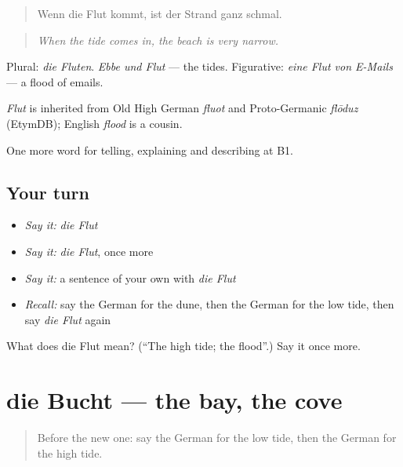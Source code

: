 \begin{quote}
Wenn die Flut kommt, ist der Strand ganz schmal.
\end{quote}

\begin{quote}
\emph{When the tide comes in, the beach is very narrow.}
\end{quote}

Plural: \emph{die Fluten}. \emph{Ebbe und Flut} — the tides. Figurative: \emph{eine Flut von E-Mails} — a flood of emails.

\begin{cousinweb}
\emph{Flut} is inherited from Old High German \emph{fluot} and Proto-Germanic \emph{flōduz} (EtymDB); English \emph{flood} is a cousin.
\end{cousinweb}

\begin{grammarlens}[title={What you've built}]
One more word for telling, explaining and describing at B1.
\end{grammarlens}

\subsection*{Your turn}
\begin{itemize}
\raggedright
  \item \emph{Say it:} \emph{die Flut}
  \item \emph{Say it:} \emph{die Flut}, once more
  \item \emph{Say it:} a sentence of your own with \emph{die Flut}
  \item \emph{Recall:} say the German for the dune, then the German for the low tide, then say \emph{die Flut} again
\end{itemize}

\begin{tcolorbox}[breakable,colback=teal!4,colframe=teal!35!black,title={Before you move on}]
What does die Flut mean? (\textquotedblleft{}The high tide; the flood\textquotedblright{}.) Say it once more.
\end{tcolorbox}
\section[die Bucht]{die Bucht — the bay, the cove}

\label{lesson:GE-C457-bucht}



\begin{quote}
Before the new one: say the German for the low tide, then the German for the high tide.
\end{quote}

